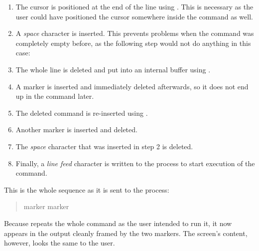 \documentclass[paper=a4,twoside,abstract=on,cleardoublepage=empty,numbers=noenddot,toc=bib,12pt,appendixprefix=true]{scrreprt}
\begin{document}
\begin{enumerate}
    \item The cursor is positioned at the end of the line using . This is necessary as the user could have positioned the cursor somewhere inside the command as well.
    \item A \emph{space} character is inserted. This prevents problems when the command was completely empty before, as the following step would not do anything in this case:
    \item The whole line is deleted and put into an internal buffer using \mbox{}.
    \item A marker is inserted and immediately deleted afterwards, so it does not end up in the command later.
    \item The deleted command is re-inserted using .
    \item Another marker is inserted and deleted.
    \item The \emph{space} character that was inserted in step 2 is deleted.
    \item Finally, a \emph{line feed} character is written to the process to start execution of the command.
\end{enumerate}

This is the whole sequence as it is sent to the process:

\begin{quote}
       marker   marker   \keys{\return}
\end{quote}

Because  repeats the whole command as the user intended to run it, it now appears in the output cleanly framed by the two markers. The screen's content, however, looks the same to the user.
\end{document}
